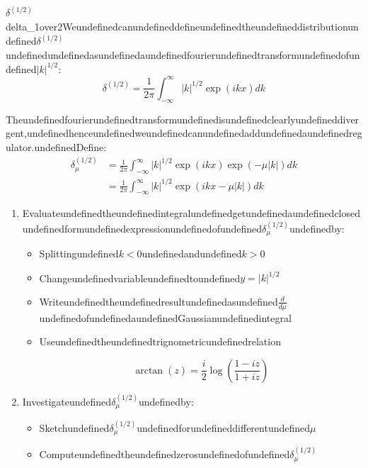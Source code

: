 \begin{mystexercise}{$\delta^{(1/2)}$}{delta_1over2}\label{delta_1over2}Weundefinedcanundefineddefineundefinedtheundefineddistributionundefined$\delta^{(1/2)}$undefinedundefinedasundefinedaundefinedfourierundefinedtransformundefinedofundefined$|k|^{1/2}$:
\begin{equation}
\delta^{(1/2)}=\frac{1}{2\pi}\int_{-\infty}^{\infty} |k|^{1/2}\exp(ikx)dk
\end{equation}

Theundefinedfourierundefinedtransformundefinedisundefinedclearlyundefineddivergent,undefinedhenceundefinedweundefinedcanundefinedaddundefinedaundefinedregulator.undefinedDefine:
\begin{equation}
\begin{aligned}
\delta^{(1/2)}_{\mu}&=\frac{1}{2\pi}\int_{-\infty}^{\infty} |k|^{1/2}\exp(ikx)\exp(-\mu|k|)dk \\
&= \frac{1}{2\pi}\int_{-\infty}^{\infty} |k|^{1/2}\exp(ikx-\mu|k|)dk
\end{aligned}
\end{equation}

\begin{enumerate}
\item Evaluateundefinedtheundefinedintegralundefinedgetundefinedaundefinedclosedundefinedformundefinedexpressionundefinedofundefined$\delta_{\mu}^{(1/2)}$undefinedby:

\begin{itemize}
\item Splittingundefined$k<0$undefinedandundefined$k>0$
\item Changeundefinedvariableundefinedtoundefined$y=|k|^{1/2}$
\item Writeundefinedtheundefinedresultundefinedasundefined$\frac{d}{d\mu}$undefinedofundefinedaundefinedGaussianundefinedintegral
\item Useundefinedtheundefinedtrignometricundefinedrelation

\begin{equation}
\arctan(z)=\frac{i}{2}\log\left(\frac{1-iz}{1+iz}\right)
\end{equation}
\end{itemize}


\item Investigateundefined$\delta^{(1/2)}_{\mu}$undefinedby:

\begin{itemize}
\item Sketchundefined$\delta^{(1/2)}_{\mu}$undefinedforundefineddifferentundefined$\mu$
\item Computeundefinedtheundefinedzerosundefinedofundefined$\delta^{(1/2)}_{\mu}$
\end{itemize}



\end{enumerate}
\end{mystexercise}
